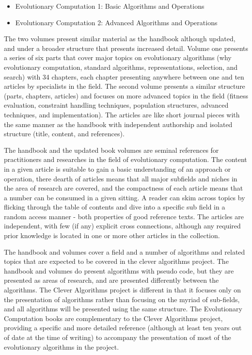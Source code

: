 \documentclass[a4paper, 11pt]{article}
\begin{document}
\begin{itemize}
	\item Evolutionary Computation 1: Basic Algorithms and Operations \cite{Baeck2000}
	\item Evolutionary Computation 2: Advanced Algorithms and Operations \cite{Baeck2000a}
\end{itemize} 

The two volumes present similar material as the handbook although updated, and under a broader structure that presents increased detail. Volume one presents a series of six parts that cover major topics on evolutionary algorithms (why evolutionary computation, standard algorithms, representations, selection, and search) with 34 chapters, each chapter presenting anywhere between one and ten articles by specialists in the field. The second volume presents a similar structure (parts, chapters, articles) and focuses on more advanced topics in the field (fitness evaluation, constraint handling techniques, population structures, advanced techniques, and implementation). The articles are like short journal pieces with the same manner as the handbook with independent authorship and isolated structure (title, content, and references).

The handbook and the updated book volumes are seminal references for practitioners and researches in the field of evolutionary computation. The content in a given article is suitable to gain a basic understanding of an approach or operation, there dearth of articles means that all major subfields and niches in the area of research are covered, and the compactness of each article means that a number can be consumed in a given sitting. 
A reader can skim across topics by flicking through the table of contents and dive into a specific sub field in a random access manner - both properties of good reference texts. The articles are independent, with few (if any) explicit cross connections, although any required prior knowledge is located in one or more other articles in the collection.

The handbook and volumes cover a field and a number of algorithms and related topics that are expected to be covered in the clever algorithms project. The handbook and volumes do present algorithms with pseudo code, but they are presented as areas of research, and are presented differently between the algorithms. The Clever Algorithms project is different in that it focuses only on the presentation of algorithms rather than focusing on the myriad of sub-fields, and all algorithms will be presented using the same structure. The Evolutionary Computation books are complementary to the Clever Algorithms project, providing a specific and more detailed reference (although at least ten years out of date at the time of writing) to accompany the presentation of most of the evolutionary algorithms in the project.
\end{document}
